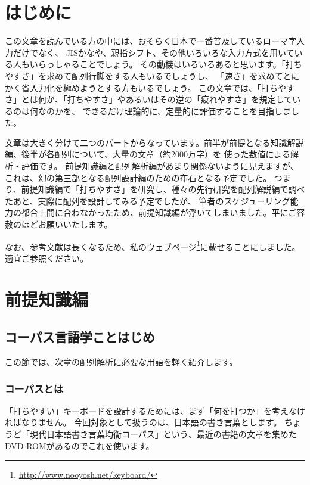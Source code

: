 
\section{はじめに}

この文章を読んでいる方の中には、おそらく日本で一番普及しているローマ字入力だけでなく、
JISかなや、親指シフト、その他いろいろな入力方式を用いている人もいらっしゃることでしょう。
その動機はいろいろあると思います。「打ちやすさ」を求めて配列行脚をする人もいるでしょうし、
「速さ」を求めてとにかく省入力化を極めようとする方もいるでしょう。
この文章では、「打ちやすさ」とは何か、「打ちやすさ」やあるいはその逆の「疲れやすさ」を規定しているのは何なのかを、
できるだけ理論的に、定量的に評価することを目指しました。

文章は大きく分けて二つのパートからなっています。前半が前提となる知識解説編、後半が各配列について、大量の文章（約2000万字）を
使った数値による解析・評価です。
前提知識編と配列解析編があまり関係ないように見えますが、これは、幻の第三部となる配列設計編のための布石となる予定でした。
つまり、前提知識編で「打ちやすさ」を研究し、種々の先行研究を配列解説編で調べたあと、実際に配列を設計してみる予定でしたが、
筆者のスケジューリング能力の都合上間に合わなかったため、前提知識編が浮いてしまいました。平にご容赦のほどお願いいたします。

なお、参考文献は長くなるため、私のウェブページ\footnote{\url{http://www.nooyosh.net/keyboard/}}に載せることにしました。適宜ご参照ください。

\section{前提知識編}

\subsection{コーパス言語学ことはじめ}

この節では、次章の配列解析に必要な用語を軽く紹介します。

\subsubsection*{コーパスとは}

「打ちやすい」キーボードを設計するためには、まず「何を打つか」を考えなければなりません。
今回対象として扱うのは、日本語の書き言葉とします。
ちょうど「現代日本語書き言葉均衡コーパス」という、最近の書籍の文章を集めたDVD-ROMがあるのでこれを使います。


